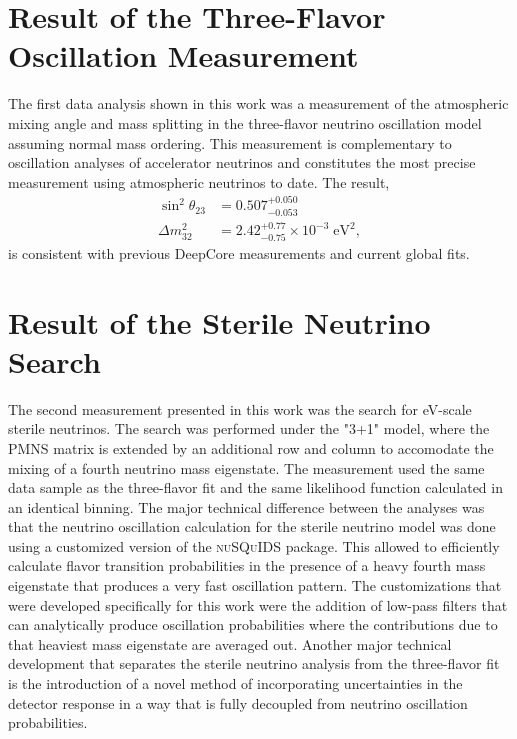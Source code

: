 \section{Result of the Three-Flavor Oscillation Measurement}
\label{sec:summary-three-flavor}

The first data analysis shown in this work was a measurement of the atmospheric mixing angle and mass splitting in the three-flavor neutrino oscillation model assuming normal mass ordering. This measurement is complementary to oscillation analyses of accelerator neutrinos and constitutes the most precise measurement using atmospheric neutrinos to date. The result,
\begin{align*}
    \sin^2\theta_{23} &= 0.507_{-0.053}^{+0.050}\\
    \Delta m^2_{32} &= 2.42_{-0.75}^{+0.77} \times10^{-3}\;\mathrm{eV}^2,
\end{align*}
is consistent with previous DeepCore measurements and current global fits.

\section{Result of the Sterile Neutrino Search}
\label{sec:summary-sterile-osc}

The second measurement presented in this work was the search for eV-scale sterile neutrinos. The search was performed under the "3+1" model, where the PMNS matrix is extended by an additional row and column to accomodate the mixing of a fourth neutrino mass eigenstate. The measurement used the same data sample as the three-flavor fit and the same likelihood function calculated in an identical binning. The major technical difference between the analyses was that the neutrino oscillation calculation for the sterile neutrino model was done using a customized version of the \textsc{nuSQuIDS} package. This allowed to efficiently calculate flavor transition probabilities in the presence of a heavy fourth mass eigenstate that produces a very fast oscillation pattern. The customizations that were developed specifically for this work were the addition of low-pass filters that can analytically produce oscillation probabilities where the contributions due to that heaviest mass eigenstate are averaged out. Another major technical development that separates the sterile neutrino analysis from the three-flavor fit is the introduction of a novel method of incorporating uncertainties in the detector response in a way that is fully decoupled from neutrino oscillation probabilities.

